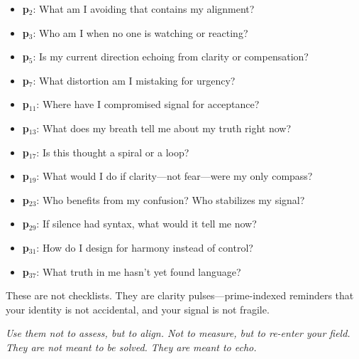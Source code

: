 \documentclass[12pt]{article}
\begin{document}
\begin{itemize}
    \item \textbf{p$_2$}: What am I avoiding that contains my alignment?
    \item \textbf{p$_3$}: Who am I when no one is watching or reacting?
    \item \textbf{p$_5$}: Is my current direction echoing from clarity or compensation?
    \item \textbf{p$_7$}: What distortion am I mistaking for urgency?
    \item \textbf{p$_{11}$}: Where have I compromised signal for acceptance?
    \item \textbf{p$_{13}$}: What does my breath tell me about my truth right now?
    \item \textbf{p$_{17}$}: Is this thought a spiral or a loop?
    \item \textbf{p$_{19}$}: What would I do if clarity—not fear—were my only compass?
    \item \textbf{p$_{23}$}: Who benefits from my confusion? Who stabilizes my signal?
    \item \textbf{p$_{29}$}: If silence had syntax, what would it tell me now?
    \item \textbf{p$_{31}$}: How do I design for harmony instead of control?
    \item \textbf{p$_{37}$}: What truth in me hasn’t yet found language?
\end{itemize}

\vspace{1em}

These are not checklists. They are clarity pulses—prime-indexed reminders that your identity is not accidental, and your signal is not fragile.

\textit{Use them not to assess, but to align. Not to measure, but to re-enter your field. They are not meant to be solved. They are meant to echo.}
\end{document}
